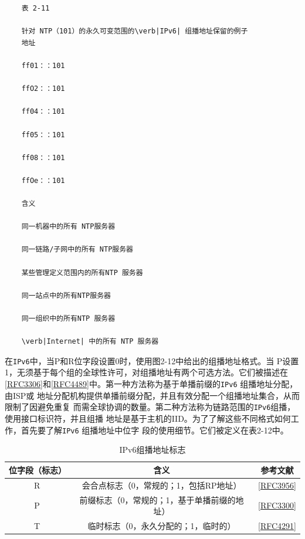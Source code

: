 \begin{verbatim}
    表 2-11
    
    针对 NTP（101）的永久可变范围的\verb|IPv6| 组播地址保留的例子
    地址
    
    ff01：：101
    
    ffO2：：101
    
    ff04：：101
    
    ff05：：101
    
    ff08：：101
    
    ffOe：：101
    
    含义
    
    同一机器中的所有 NTP服务器
    
    同一链路/子网中的所有 NTP服务器
    
    某些管理定义范围内的所有NTP 服务器
    
    同一站点中的所有NTP服务器
    
    同一组织中的所有NTP 服务器
    
    \verb|Internet| 中的所有 NTP 服务器
\end{verbatim}

在\verb|IPv6|中，当P和R位字段设置0时，使用图2-12中给出的组播地址格式。当
P设置1，无须基于每个组的全球性许可，对组播地址有两个可选方法。它们被描述在
\href{https://www.rfc-editor.org/rfc/rfc3306}{[RFC3306]}和\href{https://www.rfc-editor.org/rfc/rfc4489}{[RFC4489]}中。第一种方法称为基于单播前缀的\verb|IPv6| 组播地址分配，由ISP或
地址分配机构提供单播前缀分配，并且有效分配一个组播地址集合，从而限制了因避免重复
而需全球协调的数量。第二种方法称为链路范围的\verb|IPv6|组播，使用接口标识符，并且组播
地址是基于主机的IID。为了了解这些不同格式如何工作，首先要了解\verb|IPv6| 组播地址中位字
段的使用细节。它们被定义在表2-12中。

\begin{table}[]
    \centering
    \caption{IPv6组播地址标志}
    \begin{tabular}{c|c|c}
        \hline
        位字段（标志）  &	含义	            &	参考文献  \\ \hline
        R   &	会合点标志（0，常规的；1，包括RP地址）	        &	\href{https://www.rfc-editor.org/rfc/rfc3956}{[RFC3956]}  \\ \hline
        P	&	前缀标志（0，常规的；1，基于单播前缀的地址）	&	\href{https://www.rfc-editor.org/rfc/rfc3300}{[RFC3300]}  \\ \hline
        T	&	临时标志（0，永久分配的；1，临时的）	       &	\href{https://www.rfc-editor.org/rfc/rfc4291}{[RFC4291]}  \\ \hline
    \end{tabular}
\end{table}

